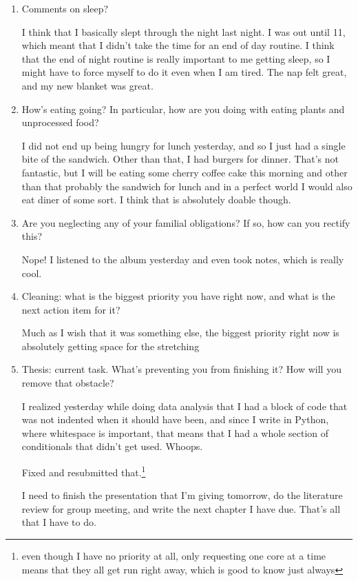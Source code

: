 \documentclass[12pt]{article}
\renewcommand{\,}{\textsuperscript{,}}
\begin{document}
\begin{enumerate}
\item Comments on sleep?

I think that I basically slept through the night last night.  
I was out until 11, which meant that I didn't take the time for an end of day routine.  
I think that the end of night routine is really important to me getting sleep, so I might have to force myself to do it even when I am tired.  
The nap felt great, and my new blanket was great.

\item How's eating going? In particular, how are you doing with eating plants and unprocessed food?

I did not end up being hungry for lunch yesterday, and so I just had a single bite of the sandwich. Other than that, I had burgers for dinner.  
That's not fantastic, but I will be eating some cherry coffee cake this morning and other than that probably the sandwich for lunch and in a perfect world I would also eat diner of some sort. I think that is absolutely doable though.

\item Are you neglecting any of your familial obligations? If so, how can you rectify this?

Nope! I listened to the album yesterday and even took notes, which is really cool.

\item Cleaning: what is the biggest priority you have right now, and what is the next action item for it?

Much as I wish that it was something else, the biggest priority right now is absolutely getting space for the stretching

\item Thesis: current task. What's preventing you from finishing it? How will you remove that obstacle?

I realized yesterday while doing data analysis that I had a block of code that was not indented when it should have been, and since I write in Python, where whitespace is important, that means that I had a whole section of conditionals that didn't get used. Whoops.

Fixed and resubmitted that.\footnote{even though I have no priority at all, only requesting one core at a time means that they all get run right away, which is good to know just always}

I need to finish the presentation that I'm giving tomorrow, do the literature review for group meeting, and write the next chapter I have due.  
That's all that I have to do.


\end{enumerate}
\end{document}
